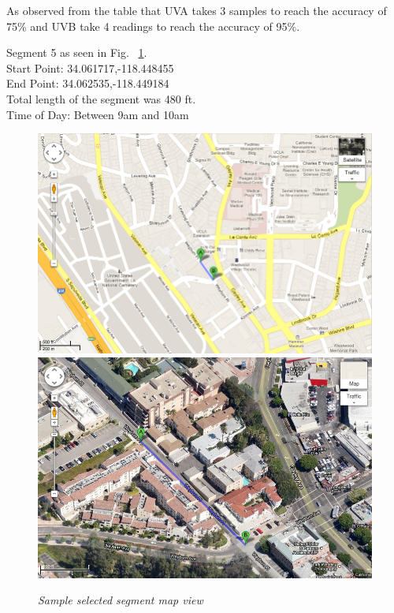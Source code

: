 \documentclass[12pt,fullpage,doublespace]{article}
\begin{document}
As observed from the table that UVA takes 3 samples to reach the accuracy of 75\% and UVB take 4 readings to reach the accuracy of 95\%. 
\newpage\newpage
\begin{center}
Segment 5 as seen in Fig. ~\ref{fig:segment5}. \\
Start Point:  34.061717,-118.448455\\
End Point:  34.062535,-118.449184 \\
Total length of the segment was 480 ft.\\
Time of Day: Between 9am and 10am\\
\begin{figure}[h]
\begin{center}
\includegraphics[scale=0.32]{segment5a.png}
\includegraphics[scale=0.32]{segment5b.png}
\caption{\small \sl Sample selected segment map view}\label{fig:segment5}
\end{center}
\end{figure}
\end{center}
\end{document}
